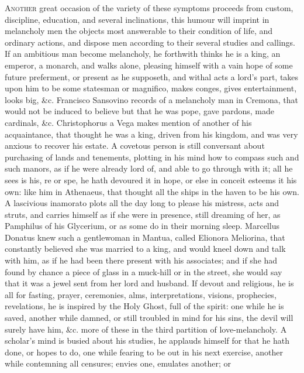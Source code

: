 {\lettrine{A}{nother} great occasion of the variety of these symptoms proceeds from
custom, discipline, education, and several inclinations, this
humour will imprint in melancholy men the objects most answerable to
their condition of life, and ordinary actions, and dispose men
according to their several studies and callings. If an ambitious man
become melancholy, he forthwith thinks he is a king, an emperor, a
monarch, and walks alone, pleasing himself with a vain hope of some
future preferment, or present as he supposeth, and withal acts a lord's
part, takes upon him to be some statesman or magnifico, makes conges,
gives entertainment, looks big, \&c. Francisco Sansovino records of a
melancholy man in Cremona, that would not be induced to believe but
that he was pope, gave pardons, made cardinals, \&c. Christophorus
a Vega makes mention of another of his acquaintance, that thought he
was a king, driven from his kingdom, and was very anxious to recover
his estate. A covetous person is still conversant about purchasing of
lands and tenements, plotting in his mind how to compass such and such
manors, as if he were already lord of, and able to go through with it;
all he sees is his, re or spe, he hath devoured it in hope, or else in
conceit esteems it his own: like him in Athenaeus, that thought
all the ships in the haven to be his own. A lascivious inamorato plots
all the day long to please his mistress, acts and struts, and carries
himself as if she were in presence, still dreaming of her, as Pamphilus
of his Glycerium, or as some do in their morning sleep. 
Marcellus Donatus knew such a gentlewoman in Mantua, called Elionora
Meliorina, that constantly believed she was married to a king, and
 would kneel down and talk with him, as if he had been there
present with his associates; and if she had found by chance a piece of
glass in a muck-hill or in the street, she would say that it was a
jewel sent from her lord and husband. If devout and religious, he is
all for fasting, prayer, ceremonies, alms, interpretations, visions,
prophecies, revelations,  he is inspired by the Holy Ghost, full
of the spirit: one while he is saved, another while damned, or still
troubled in mind for his sins, the devil will surely have him, \&c. more
of these in the third partition of love-melancholy. A scholar's
mind is busied about his studies, he applauds himself for that he hath
done, or hopes to do, one while fearing to be out in his next exercise,
another while contemning all censures; envies one, emulates another; or
}

